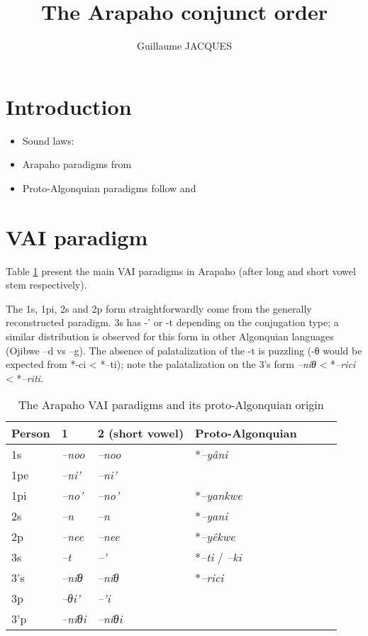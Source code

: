 \documentclass[twoside,a4paper,11pt]{article}
\newcommand{\ipa}[1]{{\phon\textit{#1}}}
\newcommand{\Σ}{\greek{Σ}}
\begin{document}
\title{The Arapaho conjunct order }

\author{Guillaume JACQUES}
\maketitle
\section{Introduction}

\begin{itemize}

 \item Sound laws: \citet{goddard74arapaho}

 \item Arapaho paradigms from \citet{cowell06arapaho}

 \item Proto-Algonquian paradigms follow \citet{bloomfield46proto} and \citet{goddard00cheyenne}
\end{itemize}
\section{VAI paradigm}
Table \ref{tab:vai} present the main VAI paradigms in Arapaho (after long and short vowel stem respectively).

The 1s, 1pi, 2s and 2p form straightforwardly come from the generally reconstructed paradigm. 3s has -' or -t depending on the conjugation type; a similar distribution is observed for this form in other Algonquian languages (Ojibwe --d  vs --g). The absence of palatalization of the -t is puzzling (-θ would be expected from *-ci < *--ti); note the palatalization on the 3's form \ipa{--níθ} < *\ipa{--rici}  < *\ipa{--riti}.

\begin{table}[H]
\caption{The Arapaho VAI paradigms and its proto-Algonquian origin}
\centering \label{tab:vai}
\begin{tabular}{lllllll}
\toprule
Person &   1 &  2 (short vowel) & Proto-Algonquian\\
\midrule
1s & 	\ipa{--noo} & 	\ipa{--noo} & 		*\ipa{--yâni} & 	\\	
1pe & 	\ipa{--ni'} & 	\ipa{--ni'} & 			\\	
1pi & 	\ipa{--no'} & 	\ipa{--no'} & 		*\ipa{--yankwe} & 	\\	
\midrule
2s & 	\ipa{--n} & 	\ipa{--n} & 		*\ipa{--yani} & 	\\	
2p & 	\ipa{--nee} & 	\ipa{--nee} & 		*\ipa{--yêkwe} & 	\\	
\midrule
3s & 	\ipa{--t} & 	\ipa{--'} & 		*\ipa{--ti} / \ipa{--ki}& 	\\	
3's & 	\ipa{--níθ} & 	\ipa{--níθ} & 		*\ipa{--rici} & 	\\	
3p & 	\ipa{--θi'} & 	\ipa{--'i} & 			\\	
3'p & 	\ipa{--níθi} & 	\ipa{--níθi} & 			\\	
\bottomrule
\end{tabular}
\end{table}
\end{document}
